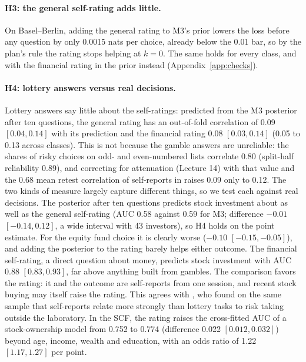 \documentclass{article}
\begin{document}
\paragraph{H3: the general self-rating adds little.} On Basel--Berlin, adding the general rating to M3's prior lowers the loss before any question by only 0.0015 nats per choice, already below the 0.01 bar, so by the plan's rule the rating stops helping at $k = 0$. The same holds for every class, and with the financial rating in the prior instead (Appendix~\ref{app:checks}).

\paragraph{H4: lottery answers versus real decisions.} Lottery answers say little about the self-ratings: predicted from the M3 posterior after ten questions, the general rating has an out-of-fold correlation of 0.09 $[0.04, 0.14]$ with its prediction and the financial rating 0.08 $[0.03, 0.14]$ (0.05 to 0.13 across classes). This is not because the gamble answers are unreliable: the shares of risky choices on odd- and even-numbered lists correlate 0.80 (split-half reliability 0.89), and correcting for attenuation (Lecture 14) with that value and the 0.68 mean retest correlation of self-reports in \citet{frey2017} raises 0.09 only to 0.12. The two kinds of measure largely capture different things, so we test each against real decisions. The posterior after ten questions predicts stock investment about as well as the general self-rating (AUC 0.58 against 0.59 for M3; difference $-0.01$ $[-0.14, 0.12]$, a wide interval with 43 investors), so H4 holds on the point estimate. For the equity fund choice it is clearly worse ($-0.10$ $[-0.15, -0.05]$), and adding the posterior to the rating barely helps either outcome. The financial self-rating, a direct question about money, predicts stock investment with AUC 0.88 $[0.83, 0.93]$, far above anything built from gambles. The comparison favors the rating: it and the outcome are self-reports from one session, and recent stock buying may itself raise the rating. This agrees with \citet{frey2017}, who found on the same sample that self-reports relate more strongly than lottery tasks to risk taking outside the laboratory. In the SCF, the rating raises the cross-fitted AUC of a stock-ownership model from 0.752 to 0.774 (difference 0.022 $[0.012, 0.032]$) beyond age, income, wealth and education, with an odds ratio of 1.22 $[1.17, 1.27]$ per point.
\end{document}

